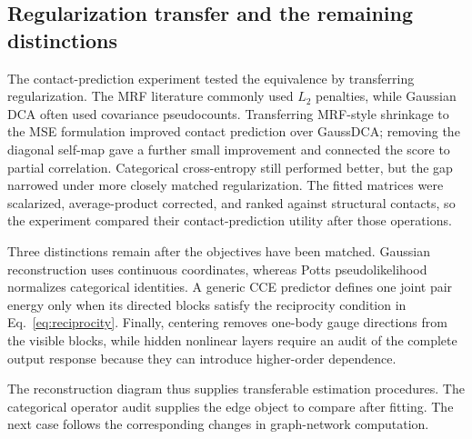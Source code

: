 \subsection{Regularization transfer and the remaining distinctions}

The contact-prediction experiment tested the equivalence by transferring regularization.  The MRF
literature commonly used $L_2$ penalties, while Gaussian DCA often used covariance pseudocounts.
Transferring MRF-style shrinkage to the MSE formulation improved contact prediction over GaussDCA;
removing the diagonal self-map gave a further small improvement and connected the score to partial
correlation.  Categorical cross-entropy still performed better, but the gap narrowed under more
closely matched regularization.  The fitted matrices were scalarized, average-product corrected,
and ranked against structural contacts, so the experiment compared their contact-prediction
utility after those operations.

Three distinctions remain after the objectives have been matched.  Gaussian reconstruction uses
continuous coordinates, whereas Potts pseudolikelihood normalizes categorical identities.  A
generic CCE predictor defines one joint pair energy only when its directed blocks satisfy the
reciprocity condition in Eq.~\ref{eq:reciprocity}.  Finally, centering removes one-body gauge
directions from the visible blocks, while hidden nonlinear layers require an audit of the complete
output response because they can introduce higher-order dependence.

The reconstruction diagram thus supplies transferable estimation procedures.  The categorical
operator audit supplies the edge object to compare after fitting.  The next case follows the
corresponding changes in graph-network computation.
